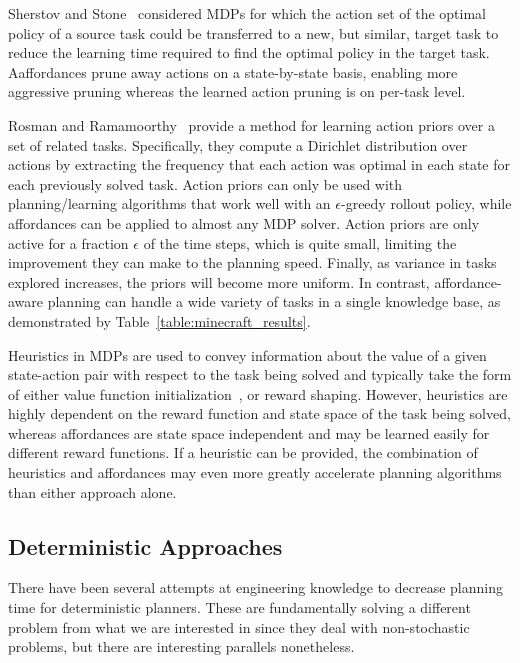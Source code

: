 \documentclass[letterpaper]{article}
\begin{document}
Sherstov and Stone~\cite{sherstov2005improving} considered MDPs for
which the action set of the optimal policy of a source task could be
transferred to a new, but similar, target task to reduce the learning
time required to find the optimal policy in the target task.
Aaffordances prune away actions on a state-by-state basis, enabling
more aggressive pruning whereas the learned action pruning is on per-task
level.

Rosman and Ramamoorthy~\cite{rosman2012good} provide a method for
learning action priors over a set of related tasks. Specifically, they
compute a Dirichlet distribution over actions by extracting the
frequency that each action was optimal in each state for each
previously solved task.  Action priors can only be used with
planning/learning algorithms that work well with an $\epsilon$-greedy
rollout policy, while affordances can be applied to almost any MDP
solver.  Action priors are only active for a fraction $\epsilon$ of
the time steps, which is quite small, limiting the improvement they
can make to the planning speed.  Finally, as variance in tasks
explored increases, the priors will become more uniform. In contrast,
affordance-aware planning can handle a wide variety of tasks in a
single knowledge base, as demonstrated by
Table~\ref{table:minecraft_results}.


Heuristics in MDPs are used to convey information about the value of a
given state-action pair with respect to the task being solved and
typically take the form of either value function
initialization~\citep{Hansen:1999qf}, or reward shaping\cite{potshap}.
However, heuristics are highly dependent on the reward function and
state space of the task being solved, whereas affordances are state
space independent and may be learned easily for different reward
functions. If a heuristic can be provided, the combination of
heuristics and affordances may even more greatly accelerate planning
algorithms than either approach alone.

\subsection{Deterministic Approaches}

There have been several attempts at engineering knowledge
to decrease planning time for deterministic planners. These are
fundamentally solving a different problem from what we are interested
in since they deal with non-stochastic problems, but there are
interesting parallels nonetheless.
\end{document}
